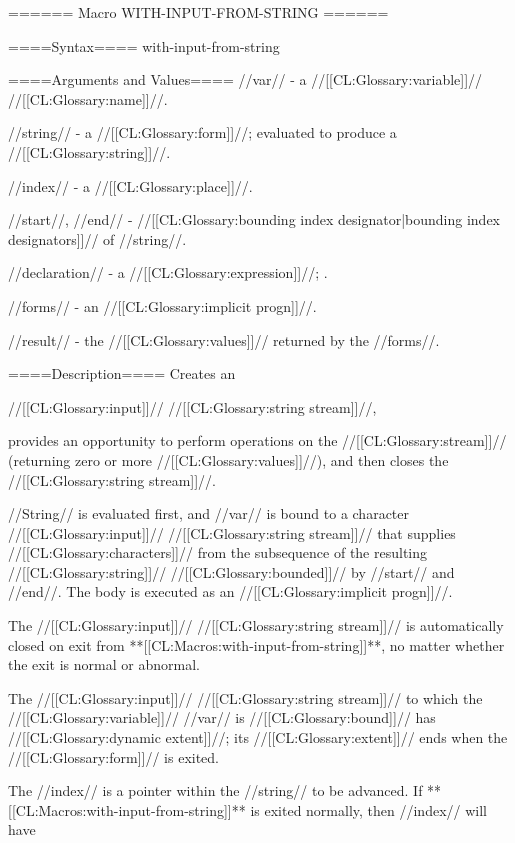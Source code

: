 ====== Macro WITH-INPUT-FROM-STRING ======

====Syntax====
\DefmacWithValuesNewline with-input-from-string {  } {}

====Arguments and Values====
//var// - a //[[CL:Glossary:variable]]// //[[CL:Glossary:name]]//.

//string// - a //[[CL:Glossary:form]]//; evaluated to produce a //[[CL:Glossary:string]]//.

//index// - a //[[CL:Glossary:place]]//.

//start//, //end// - //[[CL:Glossary:bounding index designator|bounding index designators]]// of //string//. 

//declaration// - a  //[[CL:Glossary:expression]]//; \noeval.

//forms// - an //[[CL:Glossary:implicit progn]]//.

//result// - the //[[CL:Glossary:values]]// returned by the //forms//.

====Description====
Creates an

//[[CL:Glossary:input]]// //[[CL:Glossary:string stream]]//,

provides an opportunity to perform operations on the //[[CL:Glossary:stream]]// (returning zero or more //[[CL:Glossary:values]]//), and then closes the //[[CL:Glossary:string stream]]//.

//String// is evaluated first, and //var// is bound to a character //[[CL:Glossary:input]]// //[[CL:Glossary:string stream]]// that supplies //[[CL:Glossary:characters]]// from the subsequence of the resulting //[[CL:Glossary:string]]// //[[CL:Glossary:bounded]]// by //start// and //end//. The body is executed as an //[[CL:Glossary:implicit progn]]//.

The //[[CL:Glossary:input]]// //[[CL:Glossary:string stream]]// is automatically closed on exit from **[[CL:Macros:with-input-from-string]]**, no matter whether the exit is normal or abnormal.

The //[[CL:Glossary:input]]// //[[CL:Glossary:string stream]]// to which the //[[CL:Glossary:variable]]// //var// is //[[CL:Glossary:bound]]// has //[[CL:Glossary:dynamic extent]]//; its //[[CL:Glossary:extent]]// ends when the //[[CL:Glossary:form]]// is exited.

The //index// is a pointer within the //string// to be advanced. If **[[CL:Macros:with-input-from-string]]** is exited normally, then //index// will have

